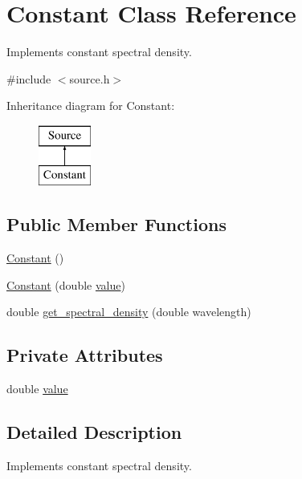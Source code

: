 \hypertarget{class_constant}{}\section{Constant Class Reference}
\label{class_constant}


Implements constant spectral density.  




{\ttfamily \#include $<$source.\+h$>$}

Inheritance diagram for Constant\+:\begin{figure}[H]
\begin{center}
\leavevmode
\includegraphics[height=2.000000cm]{class_constant}
\end{center}
\end{figure}
\subsection*{Public Member Functions}
\begin{DoxyCompactItemize}
\item 
\hyperlink{class_constant_a6d2f7d070d22aed4a3371c181da67716}{Constant} ()
\item 
\hyperlink{class_constant_aeecd18786af94c7e91a0497438caacf9}{Constant} (double \hyperlink{class_constant_ac48c9f0bb497a075190f43f2981ac5e7}{value})
\item 
double \hyperlink{class_constant_ae0526443e519154bcd338ee930bcad04}{get\+\_\+spectral\+\_\+density} (double wavelength)
\end{DoxyCompactItemize}
\subsection*{Private Attributes}
\begin{DoxyCompactItemize}
\item 
double \hyperlink{class_constant_ac48c9f0bb497a075190f43f2981ac5e7}{value}
\end{DoxyCompactItemize}


\subsection{Detailed Description}
Implements constant spectral density. 

